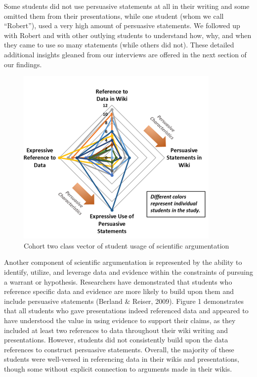 \documentclass[11.5pt]{sig-alternate} %
\begin{document}
\begin{large}
Some students did not use persuasive statements at all in their writing and some omitted them from their presentations, while one student (whom we call “Robert”), used a very high amount of persuasive statements. We followed up with Robert and with other outlying students to understand how, why, and when they came to use so many statements (while others did not). These detailed additional insights gleaned from our interviews are offered in the next section of our findings.

\begin{figure}[h]
    \centering
    \includegraphics[width=1\linewidth]{Fig 1.png}
    \caption{Cohort two class vector of student usage of scientific argumentation}
\end{figure}

Another component of scientific argumentation is represented by the ability to identify, utilize, and leverage data and evidence within the constraints of pursuing a warrant or hypothesis. Researchers have demonstrated that students who reference specific data and evidence are more likely to build upon them and include persuasive statements (Berland \& Reiser, 2009). Figure 1 demonstrates that all students who gave presentations indeed referenced data and appeared to have understood the value in using evidence to support their claims, as they included at least two references to data throughout their wiki writing and presentations. However, students did not consistently build upon the data references to construct persuasive statements. Overall, the majority of these students were well-versed in referencing data in their wikis and presentations, though some without explicit connection to arguments made in their wikis. 


\end{large}
\end{document}
